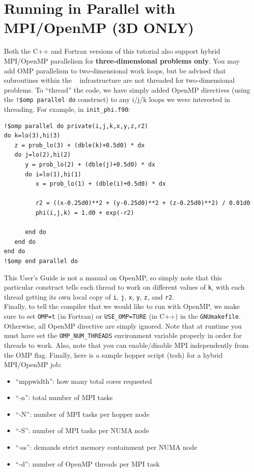 \section{Running in Parallel with MPI/OpenMP (3D ONLY)}\label{Sec:OpenMP}
Both the C++ and Fortran versions of this tutorial also support hybrid MPI/OpenMP parallelism for {\bf three-dimensional problems only}.
You may add OMP parallelism to two-dimensional work loops, but be advised that subroutines within the \BoxLib~ infrastructure 
are not threaded for two-dimensional problems.
To ``thread'' the code, we have simply added OpenMP directives (using the {\tt !\$omp parallel do} 
construct) to any i/j/k loops we were interested in threading.  For example, in {\tt init\_phi.f90}:
\begin{lstlisting}[backgroundcolor=\color{light-green}]
!$omp parallel do private(i,j,k,x,y,z,r2)
do k=lo(3),hi(3)
   z = prob_lo(3) + (dble(k)+0.5d0) * dx
   do j=lo(2),hi(2)
      y = prob_lo(2) + (dble(j)+0.5d0) * dx
      do i=lo(1),hi(1)
         x = prob_lo(1) + (dble(i)+0.5d0) * dx

         r2 = ((x-0.25d0)**2 + (y-0.25d0)**2 + (z-0.25d0)**2) / 0.01d0
         phi(i,j,k) = 1.d0 + exp(-r2)
 
      end do
   end do
end do
!$omp end parallel do
\end{lstlisting}
This User's Guide is not a manual on OpenMP, so simply note that this particular 
construct tells each thread to work on different values of {\tt k}, with each 
thread getting its own local copy of {\tt i}, {\tt j}, {\tt x}, {\tt y}, {\tt z}, and {\tt r2}.\\

Finally, to tell the compiler that we would like to run with OpenMP, we make sure to
set {\tt OMP=t} (in Fortran) or {\tt USE\_OMP=TURE} (in C++) in the {\tt GNUmakefile}.
Otherwise, all OpenMP directive are
simply ignored.  Note that at runtime you must have set the 
{\tt OMP\_NUM\_THREADS} environment variable properly in order for threads to work.
Also, note that you can enable/disable MPI independently from the OMP flag.  Finally,
here is a sample hopper script (tcsh) for a hybrid MPI/OpenMP job:

\begin{itemize}
\item ``mppwidth'': how many total cores requested
\item ``-n'': total number of MPI tasks
\item ``-N'': number of MPI tasks per hopper node
\item ``-S'': number of MPI tasks per NUMA node
\item ``-ss'': demands strict memory containment per NUMA node
\item ``-d'': number of OpenMP threads per MPI task
\end{itemize}
